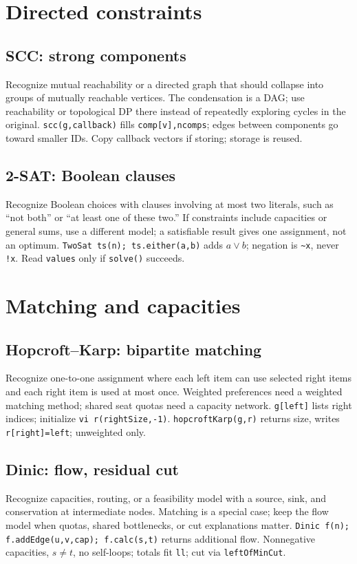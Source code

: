 \section{Directed constraints}
\subsection{SCC: strong components}
Recognize mutual reachability or a directed graph that should collapse into
groups of mutually reachable vertices. The condensation is a DAG; use reachability or
topological DP there instead of repeatedly exploring cycles in the original.
\texttt{scc(g,callback)} fills \texttt{comp[v],ncomps}; edges between components
go toward smaller IDs. Copy callback vectors if storing; storage is reused.

\subsection{2-SAT: Boolean clauses}
Recognize Boolean choices with clauses involving at most two literals,
such as ``not both'' or ``at least one of these two.'' If constraints include capacities or general sums, use a
different model; a satisfiable result gives one assignment, not an optimum.
\texttt{TwoSat ts(n); ts.either(a,b)} adds $a\lor b$; negation is
\texttt{\~{}x}, never \texttt{!x}. Read \texttt{values} only if \texttt{solve()} succeeds.

\section{Matching and capacities}
\subsection{Hopcroft--Karp: bipartite matching}
Recognize one-to-one assignment where each left item can use selected right
items and each right item is used at most once. Weighted preferences need a
weighted matching method; shared seat quotas need a capacity network.
\texttt{g[left]} lists right indices; initialize \texttt{vi r(rightSize,-1)}.
\texttt{hopcroftKarp(g,r)} returns size, writes \texttt{r[right]=left}; unweighted only.

\subsection{Dinic: flow, residual cut}
Recognize capacities, routing, or a feasibility model with a source, sink,
and conservation at intermediate nodes. Matching is a special case; keep the
flow model when quotas, shared bottlenecks, or cut explanations matter.
\texttt{Dinic f(n); f.addEdge(u,v,cap); f.calc(s,t)} returns additional flow.
Nonnegative capacities, $s\ne t$, no self-loops; totals fit \texttt{ll}; cut via \texttt{leftOfMinCut}.

